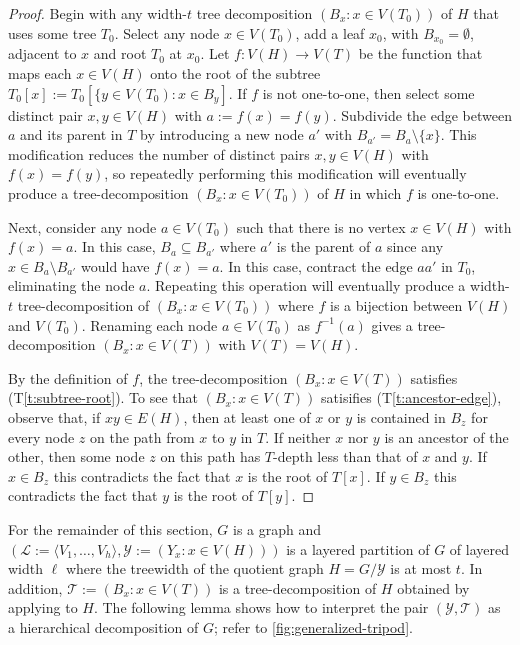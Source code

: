 \documentclass{patmorin}
\newcommand{\tref}[1]{(T\ref{t:#1})}
\begin{document}
\begin{proof}
  Begin with any width-$t$ tree decomposition $(B_x:x\in V(T_0))$ of $H$ that uses some tree $T_0$.  Select any node $x\in V(T_0)$, add a leaf $x_0$, with $B_{x_0}=\emptyset$, adjacent to $x$ and root $T_0$ at $x_0$.  Let $f:V(H)\to V(T)$ be the function that maps each $x\in V(H)$ onto the root of the subtree $T_0[x]:=T_0[\{y\in V(T_0): x\in B_y]$.  If $f$ is not one-to-one, then select some distinct pair $x,y\in V(H)$ with $a:=f(x)=f(y)$.  Subdivide the edge between $a$ and its parent in $T$ by introducing a new node $a'$ with $B_{a'}=B_{a}\setminus\{x\}$.  This modification reduces the number of distinct pairs $x,y\in V(H)$ with $f(x)=f(y)$, so repeatedly performing this modification will eventually produce a tree-decomposition $(B_x:x\in V(T_0))$ of $H$ in which $f$ is one-to-one.
  
  Next, consider any node $a\in V(T_0)$ such that there is no vertex $x\in V(H)$ with $f(x)=a$.  In this case, $B_{a}\subseteq B_{a'}$ where $a'$ is the parent of $a$ since any $x\in B_a\setminus B_{a'}$ would have $f(x)=a$.  In this case, contract the edge $aa'$ in $T_0$, eliminating the node $a$.  Repeating this operation will eventually produce a width-$t$ tree-decomposition of $(B_x:x\in V(T_0))$ where $f$ is a bijection between $V(H)$ and $V(T_0)$.  Renaming each node $a\in V(T_0)$ as $f^{-1}(a)$ gives a tree-decomposition $(B_x:x\in V(T))$ with $V(T)=V(H)$.  
  
  By the definition of $f$, the tree-decomposition $(B_x:x\in V(T))$ satisfies \tref{subtree-root}.  To see that $(B_x:x\in V(T))$ satisifies \tref{ancestor-edge}, observe that, if $xy\in E(H)$, then at least one of $x$ or $y$ is contained in $B_z$ for every node $z$ on the path from $x$ to $y$ in $T$.  If neither $x$ nor $y$ is an ancestor of the other, then some node $z$ on this path has $T$-depth less than that of $x$ and $y$.  If $x\in B_z$ this contradicts the fact that $x$ is the root of $T[x]$.  If $y\in B_z$ this contradicts the fact that $y$ is the root of $T[y]$.
\end{proof}


For the remainder of this section, $G$ is a graph and $(\mathcal{L}:=\langle V_1,\ldots,V_h\rangle,\mathcal{Y}:=(Y_x: x\in V(H)))$ is a layered partition of $G$ of layered width $\ell$ where the treewidth of the quotient graph $H=G/\mathcal{Y}$ is at most $t$.  In addition, $\mathcal{T}:=(B_x:x\in V(T))$ is a tree-decomposition of $H$ obtained by applying  to $H$.  The following lemma shows how to interpret the pair $(\mathcal{Y},\mathcal{T})$ as a hierarchical decomposition of $G$; refer to \cref{fig:generalized-tripod}.
\end{document}

